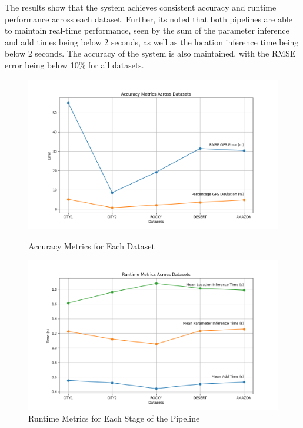 The results show that the system achieves consistent accuracy and runtime performance across each dataset. Further, its noted that both pipelines are able to maintain real-time performance, seen by the sum of the parameter inference and add times being below 2 seconds, as well as the location inference time being below 2 seconds. The accuracy of the system is also maintained, with the RMSE error being below 10\% for all datasets.


\begin{figure}[H]
    \centering
    \begin{minipage}{0.45\textwidth}
        \centering
        \includegraphics[width=\textwidth]{Chapter 5/RESULTPLOTS/key metrics/Accuracy Datasets.png}
        \caption{Accuracy Metrics for Each Dataset}
        \label{fig:Per Dataset Metrics}
    \end{minipage}\hfill
    \begin{minipage}{0.45\textwidth}
        \centering
        \includegraphics[width=\textwidth]{Chapter 5/RESULTPLOTS/key metrics/Runtime Datasets.png}
        \caption{Runtime Metrics for Each Stage of the Pipeline}
        \label{fig: Dataset Metrics}
    \end{minipage}
\end{figure}



